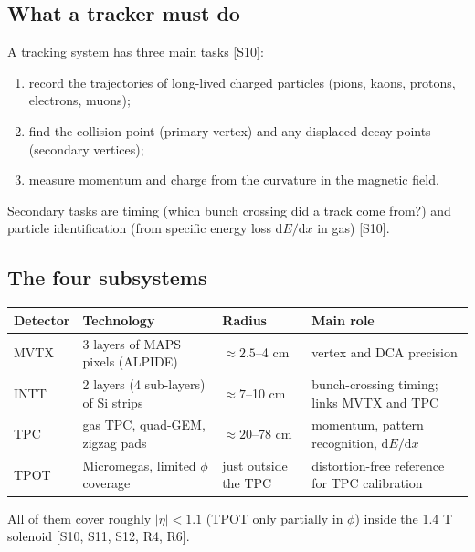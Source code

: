 \documentclass[11pt,letterpaper]{article}
\begin{document}
\subsection{What a tracker must do}
A tracking system has three main tasks [S10]:
\begin{enumerate}
\item record the trajectories of long-lived charged particles (pions, kaons, protons, electrons, muons);
\item find the collision point (primary vertex) and any displaced decay points (secondary vertices);
\item measure momentum and charge from the curvature in the magnetic field.
\end{enumerate}
Secondary tasks are timing (which bunch crossing did a track come from?) and particle identification (from specific energy loss $\mathrm{d}E/\mathrm{d}x$ in gas) [S10].

\subsection{The four subsystems}
\begin{center}\small
\begin{tabularx}{\linewidth}{@{}lllX@{}}\toprule
Detector & Technology & Radius & Main role\\\midrule
MVTX & 3 layers of MAPS pixels (ALPIDE) & $\approx2.5$--4 cm & vertex and DCA precision\\
INTT & 2 layers (4 sub-layers) of Si strips & $\approx7$--10 cm & bunch-crossing timing; links MVTX and TPC\\
TPC & gas TPC, quad-GEM, zigzag pads & $\approx20$--78 cm & momentum, pattern recognition, $\mathrm{d}E/\mathrm{d}x$\\
TPOT & Micromegas, limited $\phi$ coverage & just outside the TPC & distortion-free reference for TPC calibration\\\bottomrule
\end{tabularx}\end{center}
All of them cover roughly $|\eta|<1.1$ (TPOT only partially in $\phi$) inside the 1.4 T solenoid [S10, S11, S12, R4, R6].
\end{document}

